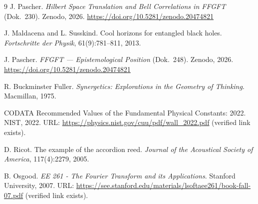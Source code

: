 	\begin{thebibliography}{9}
	J. Pascher.
	\newblock \emph{Hilbert Space Translation and Bell Correlations in FFGFT} (Dok.~230).
	\newblock Zenodo, 2026.
	\newblock \url{https://doi.org/10.5281/zenodo.20474821}

	J. Maldacena and L. Susskind.
	\newblock Cool horizons for entangled black holes.
	\newblock \emph{Fortschritte der Physik}, 61(9):781--811, 2013.

	J. Pascher.
	\newblock \emph{FFGFT --- Epistemological Position} (Dok.~248).
	\newblock Zenodo, 2026.
	\newblock \url{https://doi.org/10.5281/zenodo.20474821}

		R. Buckminster Fuller.
		\newblock \emph{Synergetics: Explorations in the Geometry of Thinking}.
		\newblock Macmillan, 1975.
		
		CODATA Recommended Values of the Fundamental Physical Constants: 2022.
		\newblock NIST, 2022.
		\newblock URL: \url{https://physics.nist.gov/cuu/pdf/wall_2022.pdf}
		(verified link exists).
		
		D. Ricot.
		\newblock The example of the accordion reed.
		\newblock \emph{Journal of the Acoustical Society of America}, 117(4):2279, 2005.
		
		B. Osgood.
		\newblock \emph{EE 261 - The Fourier Transform and its Applications}.
		\newblock Stanford University, 2007.
		\newblock URL: \url{https://see.stanford.edu/materials/lsoftaee261/book-fall-07.pdf}
		(verified link exists).
	\end{thebibliography}
